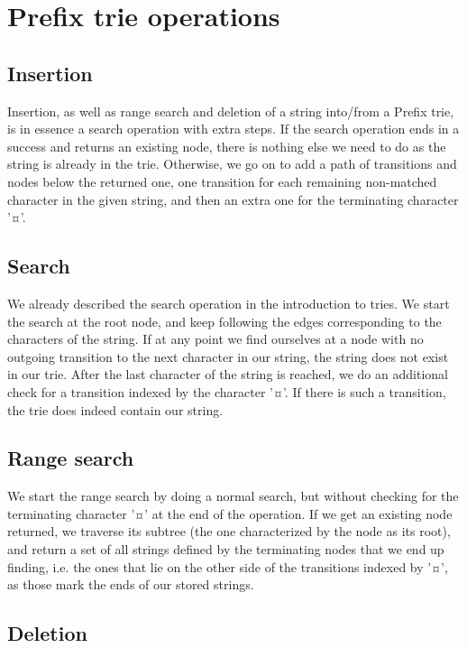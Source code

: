 \documentclass[essay]{fer}
\begin{document}
\section{Prefix trie operations}
\label{sec:prefix_trie_pseudocode}

\subsection{Insertion}

Insertion, as well as range search and deletion of a string into/from a Prefix trie, is in essence a search operation with extra steps. If the search operation ends in a success and returns an existing node, there is nothing else we need to do as the string is already in the trie. Otherwise, we go on to add a path of transitions and nodes below the returned one, one transition for each remaining non-matched character in the given string, and then an extra one for the terminating character '¤'.

\subsection{Search}

We already described the search operation in the introduction to tries. We start the search at the root node, and keep following the edges corresponding to the characters of the string. If at any point we find ourselves at a node with no outgoing transition to the next character in our string, the string does not exist in our trie.
After the last character of the string is reached, we do an additional check for a transition indexed by the character '¤'.
If there is such a transition, the trie does indeed contain our string.

\subsection{Range search}

We start the range search by doing a normal search, but without checking for the terminating character '¤' at the end of the operation.
If we get an existing node returned, we traverse its subtree (the one characterized by the node as its root), and return a set of all strings defined by the terminating nodes that we end up finding, i.e. the ones that lie on the other side of the transitions indexed by '¤', as those mark the ends of our stored strings.

\subsection{Deletion}
\end{document}
